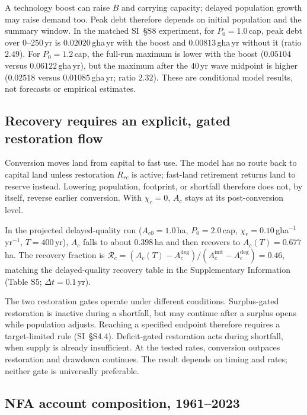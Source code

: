 A technology boost can raise $B$ and carrying capacity; delayed population growth may raise demand too. Peak debt therefore depends on initial population and the summary window. In the matched SI~\S S8 experiment, for $P_0=1.0$\,cap, peak debt over $0$--$250$\,yr is $0.02020$\,gha\,yr with the boost and $0.00813$\,gha\,yr without it (ratio $2.49$). For $P_0=1.2$\,cap, the full-run maximum is lower with the boost ($0.05104$ versus $0.06122$\,gha\,yr), but the maximum after the $40$\,yr wave midpoint is higher ($0.02518$ versus $0.01085$\,gha\,yr; ratio $2.32$). These are conditional model results, not forecasts or empirical estimates.

\subsection{Recovery requires an explicit, gated restoration flow}\label{sec:recovery}

Conversion moves land from capital to fast use. The model has no route back to capital land unless restoration $R_{rc}$ is active; fast-land retirement returns land to reserve instead. Lowering population, footprint, or shortfall therefore does not, by itself, reverse earlier conversion. With $\chi_r=0$, $A_c$ stays at its post-conversion level.

In the projected delayed-quality run ($A_{c0}=1.0$\,ha, $P_0=2.0$\,cap, $\chi_r=0.10$\,gha$^{-1}$\,yr$^{-1}$, $T=400$\,yr), $A_c$ falls to about $0.398$\,ha and then recovers to $A_c(T)=0.677$\,ha. The recovery fraction is $\mathcal R_c=(A_c(T)-A_c^{\mathrm{deg}})/(A_c^{\mathrm{init}}-A_c^{\mathrm{deg}})=0.46$, matching the delayed-quality recovery table in the Supplementary Information (Table S5; $\Delta t=0.1$\,yr).

The two restoration gates operate under different conditions. Surplus-gated restoration is inactive during a shortfall, but may continue after a surplus opens while population adjusts. Reaching a specified endpoint therefore requires a target-limited rule (SI~\S S4.4). Deficit-gated restoration acts during shortfall, when supply is already insufficient. At the tested rates, conversion outpaces restoration and drawdown continues. The result depends on timing and rates; neither gate is universally preferable.

\subsection{NFA account composition, 1961--2023}\label{sec:empirical}

